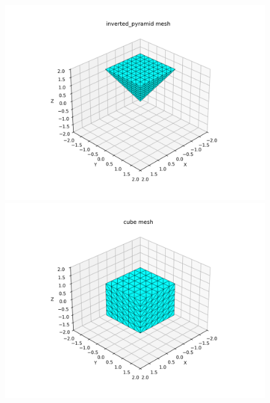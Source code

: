 \documentclass[11pt]{article}
\begin{document}
\begin{figure}[H]
\begin{minipage}{0.3\textwidth}
    \end{minipage}%
    \hfill
    \begin{minipage}{0.3\textwidth}
        \centering
        \includegraphics[width=1.1\linewidth]{../figs/inverted_pyramid.png}

    \end{minipage}%
    \hfill
    \begin{minipage}{0.3\textwidth}
        \centering
        \includegraphics[width=1.1\linewidth]{../figs/cube.png}

    \end{minipage} \\
    \vspace{0.5cm}


\end{figure}
\end{document}
